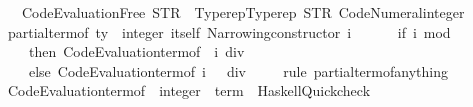 \begin{isabellebody}
\ \ \ \ Code{\isacharunderscore}{\kern0pt}Evaluation{\isachardot}{\kern0pt}Free\ {\isacharparenleft}{\kern0pt}STR\ {\isacharprime}{\kern0pt}{\isacharprime}{\kern0pt}{\isacharunderscore}{\kern0pt}{\isacharprime}{\kern0pt}{\isacharprime}{\kern0pt}{\isacharparenright}{\kern0pt}\ {\isacharparenleft}{\kern0pt}Typerep{\isachardot}{\kern0pt}Typerep\ {\isacharparenleft}{\kern0pt}STR\ {\isacharprime}{\kern0pt}{\isacharprime}{\kern0pt}Code{\isacharunderscore}{\kern0pt}Numeral{\isachardot}{\kern0pt}integer{\isacharprime}{\kern0pt}{\isacharprime}{\kern0pt}{\isacharparenright}{\kern0pt}\ {\isacharbrackleft}{\kern0pt}{\isacharbrackright}{\kern0pt}{\isacharparenright}{\kern0pt}{\isachardoublequoteclose}\isanewline
\ \ {\isachardoublequoteopen}partial{\isacharunderscore}{\kern0pt}term{\isacharunderscore}{\kern0pt}of\ {\isacharparenleft}{\kern0pt}ty\ {\isacharcolon}{\kern0pt}{\isacharcolon}{\kern0pt}\ integer\ itself{\isacharparenright}{\kern0pt}\ {\isacharparenleft}{\kern0pt}Narrowing{\isacharunderscore}{\kern0pt}constructor\ i\ {\isacharbrackleft}{\kern0pt}{\isacharbrackright}{\kern0pt}{\isacharparenright}{\kern0pt}\ {\isasymequiv}\isanewline
\ \ \ \ {\isacharparenleft}{\kern0pt}if\ i\ mod\ {}\ {\isacharequal}{\kern0pt}\ {}\isanewline
\ \ \ \ \ then\ Code{\isacharunderscore}{\kern0pt}Evaluation{\isachardot}{\kern0pt}term{\isacharunderscore}{\kern0pt}of\ {\isacharparenleft}{\kern0pt}{\isacharminus}{\kern0pt}\ i\ div\ {}{\isacharparenright}{\kern0pt}\isanewline
\ \ \ \ \ else\ Code{\isacharunderscore}{\kern0pt}Evaluation{\isachardot}{\kern0pt}term{\isacharunderscore}{\kern0pt}of\ {\isacharparenleft}{\kern0pt}{\isacharparenleft}{\kern0pt}i\ {\isacharplus}{\kern0pt}\ {}{\isacharparenright}{\kern0pt}\ div\ {}{\isacharparenright}{\kern0pt}{\isacharparenright}{\kern0pt}{\isachardoublequoteclose}\isanewline
%
\isadelimproof
\ \ %
\endisadelimproof
%
\isatagproof
{}\isamarkupfalse%
\ {\isacharparenleft}{\kern0pt}rule\ partial{\isacharunderscore}{\kern0pt}term{\isacharunderscore}{\kern0pt}of{\isacharunderscore}{\kern0pt}anything{\isacharparenright}{\kern0pt}{\isacharplus}{\kern0pt}%
\endisatagproof
{\isafoldproof}%
%
\isadelimproof
\isanewline
%
\endisadelimproof
\isanewline
{}\isamarkupfalse%
\ \ {\isachardoublequoteopen}Code{\isacharunderscore}{\kern0pt}Evaluation{\isachardot}{\kern0pt}term{\isacharunderscore}{\kern0pt}of\ {\isacharcolon}{\kern0pt}{\isacharcolon}{\kern0pt}\ integer\ {\isasymRightarrow}\ term{\isachardoublequoteclose}\ {\isasymrightharpoonup}\ {\isacharparenleft}{\kern0pt}Haskell{\isacharunderscore}{\kern0pt}Quickcheck{\isacharparenright}{\kern0pt}\ \isanewline

\end{isabellebody}
